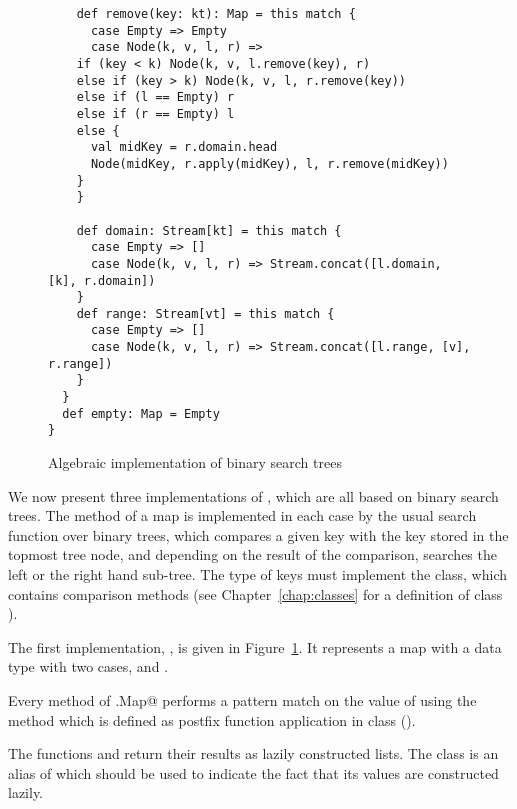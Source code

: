 \documentclass[11pt]{report}
\begin{document}
{\begin{figure}[t]
\begin{verbatim}
    def remove(key: kt): Map = this match {
      case Empty => Empty
      case Node(k, v, l, r) =>
	if (key < k) Node(k, v, l.remove(key), r)
	else if (key > k) Node(k, v, l, r.remove(key))
	else if (l == Empty) r
	else if (r == Empty) l
	else {
	  val midKey = r.domain.head
	  Node(midKey, r.apply(midKey), l, r.remove(midKey))
	}
    }

    def domain: Stream[kt] = this match {
      case Empty => []
      case Node(k, v, l, r) => Stream.concat([l.domain, [k], r.domain])
    }
    def range: Stream[vt] = this match {
      case Empty => []
      case Node(k, v, l, r) => Stream.concat([l.range, [v], r.range])
    }
  }
  def empty: Map = Empty
}
\end{verbatim}
\caption{\label{fig:algbintree}Algebraic implementation of binary
search trees}
\end{figure}
We now present three implementations of \verb@Map@, which are all
based on binary search trees. The \verb@apply@ method of a map is
implemented in each case by the usual search function over binary
trees, which compares a given key with the key stored in the topmost
tree node, and depending on the result of the comparison, searches the
left or the right hand sub-tree. The type of keys must implement the
\verb@Ord@ class, which contains comparison methods
(see Chapter~\ref{chap:classes} for a definition of class \verb@Ord@).

The first implementation, \verb@AlgBinTree@, is given in
Figure~\ref{fig:algbintree}. It represents a map with a
data type \verb@Map@ with two cases, \verb@Empty@ and \verb@Node@.

Every method of \verb@AlgBinTree[kt, vt].Map@ performs a pattern
match on the value of
\verb@this@ using the \verb@match@ method which is defined as postfix
function application in class \verb@Object@ ().

The functions \verb@domain@ and \verb@range@ return their results as
lazily constructed lists. The \verb@Stream@ class is an alias of
\verb@List@ which should be used to indicate the fact that its values
are constructed lazily.

}
\end{document}
